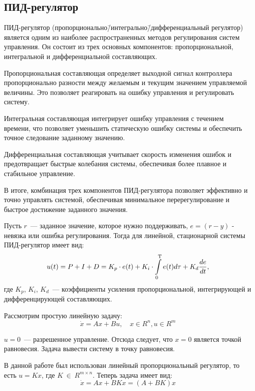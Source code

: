 \documentclass[a4paper,12pt]{article}
\begin{document}
\subsection{ПИД-регулятор}
\label{sec:regulator}

ПИД-регулятор (пропорционально\=/интегрально\=/дифференциальный регулятор) является одним из наиболее распространенных методов регулирования систем управления. Он состоит из трех основных компонентов: пропорциональной, интегральной и дифференциальной составляющих.

Пропорциональная составляющая определяет выходной сигнал контроллера пропорционально разности между желаемым и текущим значением управляемой величины. Это позволяет реагировать на ошибку управления и регулировать систему.

Интегральная составляющая интегрирует ошибку управления с течением времени, что позволяет уменьшить статическую ошибку системы и обеспечить точное следование заданному значению.

Дифференциальная составляющая учитывает скорость изменения ошибок и предотвращает быстрые колебания системы, обеспечивая более плавное и стабильное управление.

В итоге, комбинация трех компонентов ПИД-регулятора позволяет эффективно и точно управлять системой, обеспечивая минимальное перерегулирование и быстрое достижение заданного значения.

Пусть $r$~--- заданное значение, которое нужно поддерживать, $e = (r-y)$ - невязка или ошибка регулирования. Тогда для линейной, стационарной системы ПИД-регулятор имеет вид:
\begin{equation}
    u(t) = P + I + D = K_p\cdot e(t) + K_i \cdot \int\limits_0^\text{\textup{T}} e(t) d\tau + K_d \frac{de}{dt},
\end{equation} 
где $K_p$, $K_i$, $K_d$~--- коэффициенты усиления пропорциональной, интегрирующей и дифференцирующей составляющих.

Рассмотрим простую линейную задачу:
\begin{equation}\label{PID}
    \Dot{x} = Ax + Bu,\quad x \in R^n, u \in R^m
\end{equation}

$u = 0 $~--- разрешенное управление. Отсюда следует, что $x = 0$ является точкой равновесия. Задача вывести систему в точку равновесия.

В данной работе был использован линейный пропорциональный регулятор, то есть $u = Kx$, где $K~\in~R^{m\times n}$.
Теперь задача имеет вид:
\begin{equation}\label{PID_lin}
    \Dot{x} = Ax + BKx = (A+BK)x
\end{equation}
\end{document}
